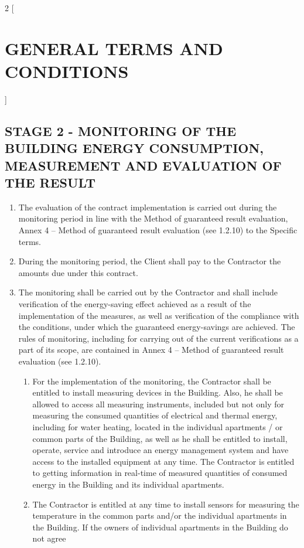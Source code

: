 \begin{multicols}{2} [\section{GENERAL TERMS AND CONDITIONS}]
      \subsection{STAGE 2 {-} MONITORING OF THE BUILDING ENERGY
        CONSUMPTION, MEASUREMENT AND EVALUATION OF THE RESULT}
      \begin{enumerate}
      \item The evaluation of the contract implementation is carried
        out during the monitoring period in line with the Method of
        guaranteed result evaluation, Annex 4 – Method of guaranteed
        result evaluation (see 1.2.10) to the Specific terms.
      \item During the monitoring period, the Client shall pay to the
        Contractor the amounts due under this contract.
      \item The monitoring shall be carried out by the Contractor and
        shall include verification of the energy-saving effect
        achieved as a result of the implementation of the measures, as
        well as verification of the compliance with the conditions,
        under which the guaranteed energy-savings are achieved. The
        rules of monitoring, including for carrying out of the current
        verifications as a part of its scope, are contained in Annex 4
        – Method of guaranteed result evaluation (see 1.2.10).
        \begin{enumerate}
        \item For the implementation of the monitoring, the Contractor
          shall be entitled to install measuring devices in the
          Building. Also, he shall be allowed to access all measuring
          instruments, included but not only for measuring the
          consumed quantities of electrical and thermal energy,
          including for water heating, located in the individual
          apartments / or common parts of the Building, as well as he
          shall be entitled to install, operate, service and introduce
          an energy management system and have access to the installed
          equipment at any time. The Contractor is entitled to getting
          information in real-time of measured quantities of consumed
          energy in the Building and its individual apartments.
        \item The Contractor is entitled at any time to install
          sensors for measuring the temperature in the common parts
          and/or the individual apartments in the Building. If the
          owners of individual apartments in the Building do not agree

\end{enumerate}
\end{enumerate}
\end{multicols}

